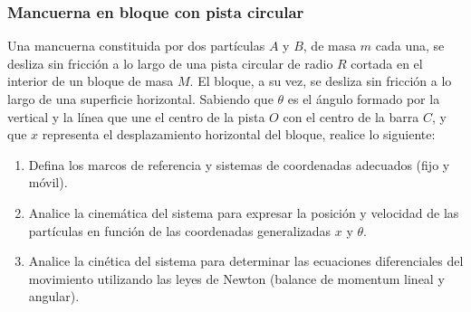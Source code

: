 \subsubsection{Mancuerna en bloque con pista circular}

Una mancuerna constituida por dos partículas $A$ y $B$, de masa $m$ cada una, se desliza sin fricción a lo largo de una pista circular de radio $R$ cortada en el interior de un bloque de masa $M$. El bloque, a su vez, se desliza sin fricción a lo largo de una superficie horizontal. Sabiendo que $\theta$ es el ángulo formado por la vertical y la línea que une el centro de la pista $O$ con el centro de la barra $C$, y que $x$ representa el desplazamiento horizontal del bloque, realice lo siguiente:

\begin{enumerate}
    \item Defina los marcos de referencia y sistemas de coordenadas adecuados (fijo y móvil).
    \item Analice la cinemática del sistema para expresar la posición y velocidad de las partículas en función de las coordenadas generalizadas $x$ y $\theta$.
    \item Analice la cinética del sistema para determinar las ecuaciones diferenciales del movimiento utilizando las leyes de Newton (balance de momentum lineal y angular).
\end{enumerate}

